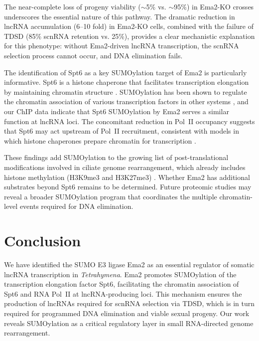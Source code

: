 \documentclass[11pt]{article}
\begin{document}
The near-complete loss of progeny viability ($\sim$5\% vs. $\sim$95\%) in Ema2-KO crosses underscores the essential nature of this pathway. The dramatic reduction in lncRNA accumulation (6--10 fold) in Ema2-KO cells, combined with the failure of TDSD (85\% scnRNA retention vs. 25\%), provides a clear mechanistic explanation for this phenotype: without Ema2-driven lncRNA transcription, the scnRNA selection process cannot occur, and DNA elimination fails.

The identification of Spt6 as a key SUMOylation target of Ema2 is particularly informative. Spt6 is a histone chaperone that facilitates transcription elongation by maintaining chromatin structure \citep{bortvin1996,close2011}. SUMOylation has been shown to regulate the chromatin association of various transcription factors in other systems \citep{rosonina2017}, and our ChIP data indicate that Spt6 SUMOylation by Ema2 serves a similar function at lncRNA loci. The concomitant reduction in Pol~II occupancy suggests that Spt6 may act upstream of Pol~II recruitment, consistent with models in which histone chaperones prepare chromatin for transcription \citep{ivanovska2011}.

These findings add SUMOylation to the growing list of post-translational modifications involved in ciliate genome rearrangement, which already includes histone methylation (H3K9me3 and H3K27me3) \citep{liu2007,taverna2002}. Whether Ema2 has additional substrates beyond Spt6 remains to be determined. Future proteomic studies may reveal a broader SUMOylation program that coordinates the multiple chromatin-level events required for DNA elimination.

\section{Conclusion}

We have identified the SUMO E3 ligase Ema2 as an essential regulator of somatic lncRNA transcription in \textit{Tetrahymena}. Ema2 promotes SUMOylation of the transcription elongation factor Spt6, facilitating the chromatin association of Spt6 and RNA Pol~II at lncRNA-producing loci. This mechanism ensures the production of lncRNAs required for scnRNA selection via TDSD, which is in turn required for programmed DNA elimination and viable sexual progeny. Our work reveals SUMOylation as a critical regulatory layer in small RNA-directed genome rearrangement.



\end{document}
